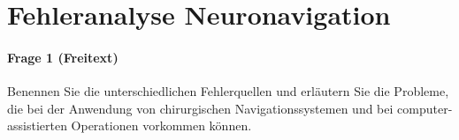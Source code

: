 \section*{Fehleranalyse Neuronavigation}

\paragraph{Frage 1 (Freitext)}

Benennen Sie die unterschiedlichen Fehlerquellen und erläutern Sie die Probleme, die bei der Anwendung von chirurgischen Navigationssystemen und bei computer-assistierten Operationen vorkommen können.